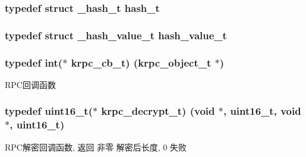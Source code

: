 \subsubsection[{hash\+\_\+t}]{\setlength{\rightskip}{0pt plus 5cm}typedef struct {\bf \+\_\+hash\+\_\+t} {\bf hash\+\_\+t}}\label{a00051_a188677c3015513590ab998e96b999966_a188677c3015513590ab998e96b999966}
\hypertarget{a00051_af7ecd66aeef0ce1b0495e5f65e77733e_af7ecd66aeef0ce1b0495e5f65e77733e}{}
\subsubsection[{hash\+\_\+value\+\_\+t}]{\setlength{\rightskip}{0pt plus 5cm}typedef struct {\bf \+\_\+hash\+\_\+value\+\_\+t} {\bf hash\+\_\+value\+\_\+t}}\label{a00051_af7ecd66aeef0ce1b0495e5f65e77733e_af7ecd66aeef0ce1b0495e5f65e77733e}
\hypertarget{a00051_a06bb708c1b97445d3a5d0c1b32ad2ab6_a06bb708c1b97445d3a5d0c1b32ad2ab6}{}
\subsubsection[{krpc\+\_\+cb\+\_\+t}]{\setlength{\rightskip}{0pt plus 5cm}typedef int($\ast$ krpc\+\_\+cb\+\_\+t) ({\bf krpc\+\_\+object\+\_\+t} $\ast$)}\label{a00051_a06bb708c1b97445d3a5d0c1b32ad2ab6_a06bb708c1b97445d3a5d0c1b32ad2ab6}
R\+P\+C回调函数 \hypertarget{a00051_a5cf750f151c90f0589f68fe8c4421f1d_a5cf750f151c90f0589f68fe8c4421f1d}{}
\subsubsection[{krpc\+\_\+decrypt\+\_\+t}]{\setlength{\rightskip}{0pt plus 5cm}typedef uint16\+\_\+t($\ast$ krpc\+\_\+decrypt\+\_\+t) (void $\ast$, uint16\+\_\+t, void $\ast$, uint16\+\_\+t)}\label{a00051_a5cf750f151c90f0589f68fe8c4421f1d_a5cf750f151c90f0589f68fe8c4421f1d}
R\+P\+C解密回调函数, 返回 非零 解密后长度, 0 失败 \hypertarget{a00051_ae41a67cc07f8dff897ca978e03b1f2d7_ae41a67cc07f8dff897ca978e03b1f2d7}{}
